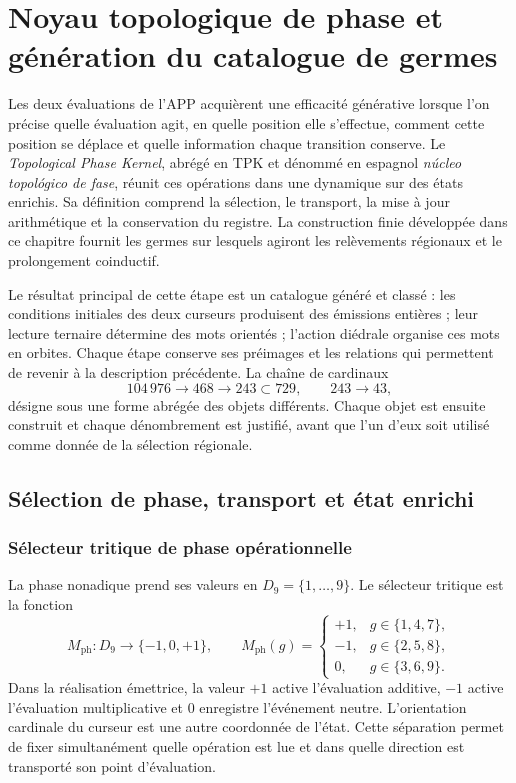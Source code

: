 \section{Noyau topologique de phase et génération du catalogue de germes}
\label{act21:tpk:capitulo}

Les deux évaluations de l'APP acquièrent une efficacité générative lorsque l'on précise
quelle évaluation agit, en quelle position elle s'effectue, comment cette position se déplace
et quelle information chaque transition conserve. Le \emph{Topological Phase Kernel},
abrégé en TPK et dénommé en espagnol \emph{núcleo topológico de fase}, réunit
ces opérations dans une dynamique sur des états enrichis. Sa définition
comprend la sélection, le transport, la mise à jour arithmétique et la conservation du
registre. La construction finie développée dans ce chapitre fournit
les germes sur lesquels agiront les relèvements régionaux et le prolongement
coinductif.

Le résultat principal de cette étape est un catalogue généré et classé :
les conditions initiales des deux curseurs produisent des émissions entières ;
leur lecture ternaire détermine des mots orientés ; l'action diédrale organise
ces mots en orbites. Chaque étape conserve ses préimages et les relations
qui permettent de revenir à la description précédente. La chaîne de cardinaux
\[
 104\,976\longrightarrow468\longrightarrow243\subset729,
 \qquad 243\longrightarrow43,
\]
désigne sous une forme abrégée des objets différents. Chaque objet est ensuite construit et chaque dénombrement
est justifié, avant que l'un d'eux soit utilisé comme donnée de
la sélection régionale.

\subsection{Sélection de phase, transport et état enrichi}
\label{act21:tpk:operaciones}

\subsubsection{Sélecteur tritique de phase opérationnelle}

La phase nonadique prend ses valeurs en \(D_9=\{1,\ldots,9\}\). Le sélecteur  
tritique est la fonction
\begin{equation}
 M_{\mathrm{ph}}:D_9\longrightarrow\{-1,0,+1\},\qquad
 M_{\mathrm{ph}}(g)=
 \begin{cases}
 +1,&g\in\{1,4,7\},\\
 -1,&g\in\{2,5,8\},\\
 0,&g\in\{3,6,9\}.
 \end{cases}
 \label{act21:tpk:selector}
\end{equation}
Dans la réalisation émettrice, la valeur \(+1\) active l'évaluation additive,
\(-1\) active l'évaluation multiplicative et \(0\) enregistre l'événement
neutre. L'orientation cardinale du curseur est une autre coordonnée de l'état.
Cette séparation permet de fixer simultanément quelle opération est lue et dans quelle
direction est transporté son point d'évaluation.

